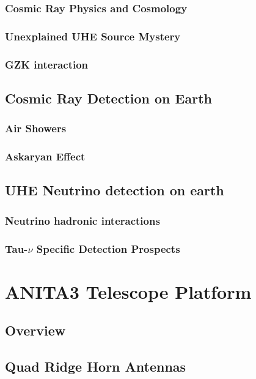 \documentclass[11pt]{uhthesis}
\begin{document}
	\subsection{Cosmic Ray Physics and Cosmology}
	
	\subsection{Unexplained UHE Source Mystery}

	\subsection{GZK interaction}
		
\section{Cosmic Ray Detection on Earth}
	\subsection{Air Showers}
	
	\subsection{Askaryan Effect}

\section{UHE Neutrino detection on earth}
	\subsection{Neutrino hadronic interactions}

	\subsection{Tau-$\nu$ Specific Detection Prospects}


\chapter{ANITA3 Telescope Platform}
\section{Overview}

\section{Quad Ridge Horn Antennas}
	
\end{document}
